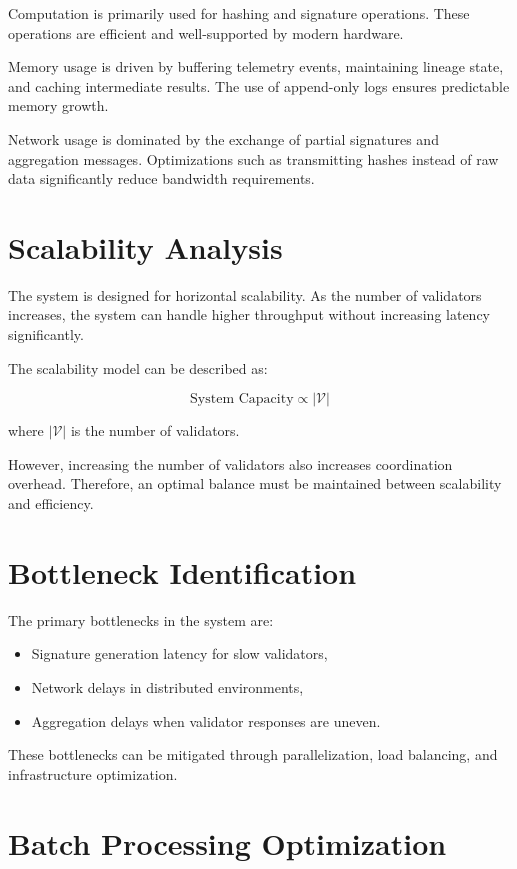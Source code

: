 Computation is primarily used for hashing and signature operations. These operations are efficient and well-supported by modern hardware.

Memory usage is driven by buffering telemetry events, maintaining lineage state, and caching intermediate results. The use of append-only logs ensures predictable memory growth.

Network usage is dominated by the exchange of partial signatures and aggregation messages. Optimizations such as transmitting hashes instead of raw data significantly reduce bandwidth requirements.

\section{Scalability Analysis}

The system is designed for horizontal scalability. As the number of validators increases, the system can handle higher throughput without increasing latency significantly.

The scalability model can be described as:

\begin{equation}
\text{System Capacity} \propto |\mathcal{V}|
\end{equation}

where $|\mathcal{V}|$ is the number of validators.

However, increasing the number of validators also increases coordination overhead. Therefore, an optimal balance must be maintained between scalability and efficiency.

\section{Bottleneck Identification}

The primary bottlenecks in the system are:

\begin{itemize}
\item Signature generation latency for slow validators,
\item Network delays in distributed environments,
\item Aggregation delays when validator responses are uneven.
\end{itemize}

These bottlenecks can be mitigated through parallelization, load balancing, and infrastructure optimization.

\section{Batch Processing Optimization}

